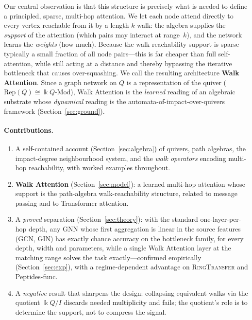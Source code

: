 \documentclass[runningheads]{llncs}
\newcommand{\kk}{\Bbbk}
\newcommand{\kQ}{\kk Q}
\begin{document}
Our central observation is that this structure is precisely what is needed to
define a principled, sparse, multi-hop attention. We let each node attend
directly to every vertex reachable from it by a length-$k$ walk: the algebra
supplies the \emph{support} of the attention (which pairs may interact at
range~$k$), and the network learns the \emph{weights} (how much). Because the
walk-reachability support is sparse---typically a small fraction of all node
pairs---this is far cheaper than full self-attention, while still acting at a
distance and thereby bypassing the iterative bottleneck that causes
over-squashing. We call the resulting architecture \textbf{Walk Attention}.
Since a graph network on $Q$ is a representation of the quiver
($\mathrm{Rep}(Q)\cong\kQ\text{-}\mathrm{Mod}$), Walk Attention is the
\emph{learned} reading of an algebraic substrate whose \emph{dynamical} reading
is the automata-of-impact-over-quivers framework \cite{zainea2026aiq}
(Section~\ref{sec:ground}).

\paragraph{Contributions.}
\begin{enumerate}
  \item A self-contained account (Section~\ref{sec:algebra}) of quivers, path
  algebras, the impact-degree neighbourhood system, and the \emph{walk
  operators} encoding multi-hop reachability, with worked examples throughout.
  \item \textbf{Walk Attention} (Section~\ref{sec:model}): a learned multi-hop
  attention whose support is the path-algebra walk-reachability structure,
  related to message passing and to Transformer attention.
  \item A \emph{proved} separation (Section~\ref{sec:theory}): with the
  standard one-layer-per-hop depth, any GNN whose first aggregation is linear
  in the source features (GCN, GIN) has exactly chance accuracy on the
  bottleneck family, for every depth, width and parameters, while a single Walk
  Attention layer at the matching range solves the task exactly---confirmed
  empirically (Section~\ref{sec:exp}), with a regime-dependent advantage on
  \textsc{RingTransfer} and Peptides-func.
  \item A \emph{negative} result that sharpens the design: collapsing
  equivalent walks via the quotient $\kQ/I$ discards needed multiplicity and
  fails; the quotient's role is to determine the support, not to compress the
  signal.
\end{enumerate}
\end{document}

